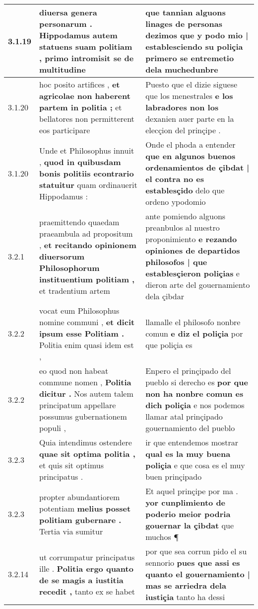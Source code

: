 \begin{tabular}{|p{1cm}|p{6.5cm}|p{6.5cm}|}
3.1.19 & diuersa genera personarum . \textbf{ Hippodamus autem statuens suam politiam , } primo intromisit se de multitudine & que tannian alguons linages de personas dezimos \textbf{ que y podo mio | establesciendo su poliçia } primero se entremetio dela muchedunbre \\\hline
3.1.20 & hoc posito artifices , \textbf{ et agricolae non haberent partem in politia ; } et bellatores non permitterent eos participare & Puesto que el dizie siguese que los menestrales \textbf{ e los labradores non los } dexanien auer parte en la elecçion del prinçipe . \\\hline
3.1.20 & Unde et Philosophus innuit , \textbf{ quod in quibusdam bonis politiis econtrario statuitur } quam ordinauerit Hippodamus : & Onde el phoda a entender \textbf{ que en algunos buenos ordenamientos de çibdat | el contra no es establesçido } delo que ordeno ypodomio \\\hline
3.2.1 & praemittendo quaedam praeambula ad propositum , \textbf{ et recitando opinionem diuersorum Philosophorum instituentium politiam , } et tradentium artem & ante pomiendo alguons preanbulos al nuestro proponimiento \textbf{ e rezando opiniones de departidos philosofos | que establesçieron poliçias } e dieron arte del gouernamiento dela çibdar \\\hline
3.2.2 & vocat eum Philosophus nomine communi , \textbf{ et dicit ipsum esse Politiam . } Politia enim quasi idem est , & llamalle el philosofo nonbre comun \textbf{ e diz el poliçia } por que poliçia es \\\hline
3.2.2 & eo quod non habeat commune nomen , \textbf{ Politia dicitur . } Nos autem talem principatum appellare possumus gubernationem populi , & Enpero el prinçipado del pueblo si derecho es \textbf{ por que non ha nonbre comun es dich poliçia } e nos podemos llamar atal prinçipado gouernamiento del pueblo \\\hline
3.2.3 & Quia intendimus ostendere \textbf{ quae sit optima politia , } et quis sit optimus principatus . & ir que entendemos mostrar \textbf{ qual es la muy buena poliçia } e que cosa es el muy buen prinçipado \\\hline
3.2.3 & propter abundantiorem potentiam \textbf{ melius posset politiam gubernare . } Tertia via sumitur & Et aquel prinçipe por ma . \textbf{ yor cunplimiento de poderio meior podria gouernar la çibdat } que muchos ¶ \\\hline
3.2.14 & ut corrumpatur principatus ille . \textbf{ Politia ergo quanto de se magis a iustitia recedit , } tanto ex se habet & por que sea corrun pido el su sennorio \textbf{ pues que assi es quanto el gouernamiento | mas se arriedra dela iustiçia } tanto ha dessi \\\hline

\end{tabular}
